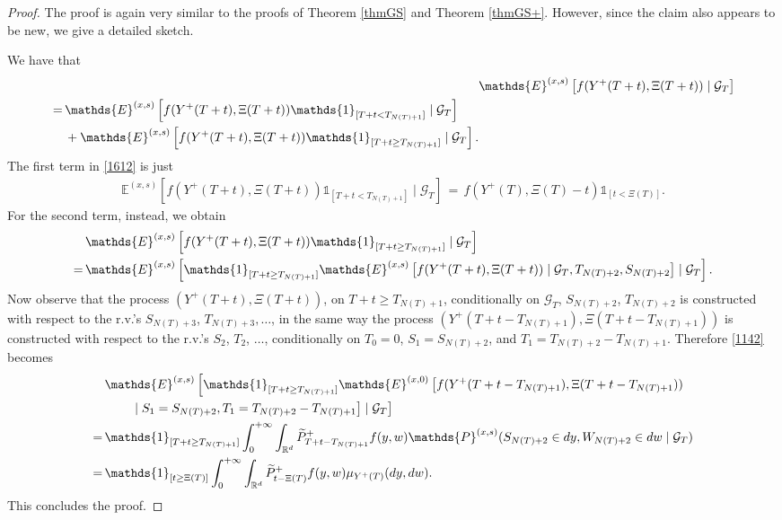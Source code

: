 \documentclass[reqno]{amsart}
\theoremstyle{remark}
\numberwithin{equation}{section} %
\newcommand{\wt}{\widetilde}
\newcommand{\1}{\mathds{1}}
\begin{document}
	\begin{proof}
		The proof is again very similar to the proofs of Theorem \ref{thmGS} and Theorem \ref{thmGS+}. However, since the claim also appears to be new, we give a detailed sketch.
		
		We have that
		\begin{align}
			&\mathds{E}^{(x,s)} \left[ f(Y^+(T+t), \Xi(T+t)) \mid \mathcal{G}_T \right] \notag \\
			\begin{split}\label{1612}
				\, = \, & \mathds{E}^{(x,s)} \left[ f(Y^+(T+t), \Xi(T+t)) \mathds{1}_{[T+t < T_{N(T)+1}]} \mid \mathcal{G}_T \right] \notag \\ & + \mathds{E}^{(x,s)} \left[ f(Y^+(T+t), \Xi(T+t)) \mathds{1}_{[T+t \geq T_{N(T)+1}]} \mid \mathcal{G}_T \right].
			\end{split}
		\end{align}
		The first term in \eqref{1612} is just
		\begin{align}
			\mathds{E}^{(x,s)} \left[ f(Y^+(T+t), \Xi(T+t)) \mathds{1}_{[T+t < T_{N(T)+1}]} \mid \mathcal{G}_T \right] \, = \, f(Y^+(T), \Xi(T)-t)\mathds{1}_{[t < \Xi(T)]}.
		\end{align}
		For the second term, instead, we obtain
		\begin{align}
			&\mathds{E}^{(x,s)} \left[ f(Y^+(T+t), \Xi(T+t)) \mathds{1}_{[T+t \geq T_{N(T)+1}]} \mid \mathcal{G}_T \right] \notag \\
			= \, &\mathds{E}^{(x,s)} \left[ \mathds{1}_{[T+t \geq T_{N(T)+1}]} \mathds{E}^{(x,s)} \left[  f(Y^+(T+t), \Xi(T+t)) \mid \mathcal{G}_T, T_{N(T)+2}, S_{N(T)+2} \right] \mid \mathcal{G}_T  \right].\label{1142}
		\end{align}
		Now observe that the process $(Y^+(T+t), \Xi(T+t))$, on $T+t \geq T_{N(T)+1}$, conditionally on $\mathcal{G}_T$, $S_{N(T)+2}$, $T_{N(T)+2}$ is constructed with respect to the r.v.'s $S_{N(T)+3}$, $T_{N(T)+3},\dots$, in the same way the process $(Y^+(T+t-T_{N(T)+1}), \Xi(T+t-T_{N(T)+1}))$ is constructed with respect to the r.v.'s $S_2$, $T_2$, $\dots$, conditionally on $T_0=0$, $S_1 = S_{N(T)+2}$, and $T_1 = T_{N(T)+2}-T_{N(T)+1}$. Therefore \eqref{1142} becomes
		\begin{align}
			&\mathds{E}^{(x,s)} \left[ \mathds{1}_{[T+t \geq T_{N(T)+1}]} \mathds{E}^{(x,0)} \left[  f(Y^+(T+t-T_{N(T)+1}), \Xi(T+t-T_{N(T)+1})) \right. \right. \notag  \\ & \left. \left. \qquad \mid S_1=S_{N(T)+2}, T_1= T_{N(T)+2}-T_{N(T)+1} \right] \mid \mathcal{G}_T  \right] \notag \\
			= \, &\mathds{1}_{[T+t \geq T_{N(T)+1}]} \int_0^{+\infty} \int_{\mathbb{R}^d} \wt P^+_{T+t-T_{N(T)+1}}f(y, w) \mathds{P}^{(x,s)} (S_{N(T)+2} \in dy, W_{N(T)+2} \in dw \mid \mathcal{G}_T) \notag \\
			= \, &\mathds{1}_{[t \geq \Xi(T)]} \int_0^{+\infty} \int_{\mathbb{R}^d} {\wt P}^+_{t-\Xi(T)}f(y, w) \mu_{{Y^+(T)}} (dy, dw).
		\end{align} 
		This concludes the proof.
	\end{proof}
	
\end{document}
